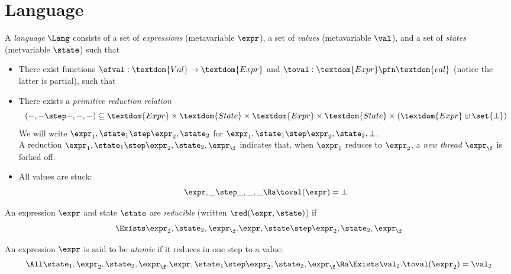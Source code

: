 \section{Language}

A \emph{language} $\Lang$ consists of a set  of \emph{expressions} (metavariable $\expr$), a set  of \emph{values} (metavariable $\val$), and a set  of \emph{states} (metvariable $\state$) such that
\begin{itemize}
\item There exist functions $\ofval : \textdom{Val} \to \textdom{Expr}$ and $\toval : \textdom{Expr} \pfn \textdom{val}$ (notice the latter is partial), such that
\item There exists a \emph{primitive reduction relation} \[(-,- \step -,-,-) \subseteq \textdom{Expr} \times \textdom{State} \times \textdom{Expr} \times \textdom{State} \times (\textdom{Expr} \uplus \set{\bot})\]
  We will write $\expr_1, \state_1 \step \expr_2, \state_2$ for $\expr_1, \state_1 \step \expr_2, \state_2, \bot$. \\
  A reduction $\expr_1, \state_1 \step \expr_2, \state_2, \expr_\f$ indicates that, when $\expr_1$ reduces to $\expr_2$, a \emph{new thread} $\expr_\f$ is forked off.
\item All values are stuck:
\[ \expr, \_ \step  \_, \_, \_ \Ra \toval(\expr) = \bot \]
\end{itemize}

\begin{defn}
  An expression $\expr$ and state $\state$ are \emph{reducible} (written $\red(\expr, \state)$) if
  \[ \Exists \expr_2, \state_2, \expr_\f. \expr,\state \step \expr_2,\state_2,\expr_\f \]
\end{defn}

\begin{defn}
  An expression $\expr$ is said to be \emph{atomic} if it reduces in one step to a value:
  \[ \All\state_1, \expr_2, \state_2, \expr_\f. \expr, \state_1 \step \expr_2, \state_2, \expr_\f \Ra \Exists \val_2. \toval(\expr_2) = \val_2 \]
\end{defn}

